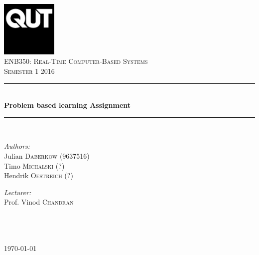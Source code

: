\begin{titlepage}

\begin{center}


\includegraphics[width=0.20\textwidth]{./media/QUT_Square_black.jpg}\\[1cm]    

\textsc{\LARGE ENB350: Real-Time Computer-Based Systems}\\[1.5cm]

\textsc{\Large Semester 1 2016}\\[0.5cm]


\newcommand{\HRule}{\rule{\linewidth}{0.5mm}}
\HRule \\[0.6cm]
{ \huge \bfseries Problem based learning Assignment}\\[0.4cm]

\HRule \\[1.5cm]

\begin{minipage}{0.4\textwidth}
\begin{flushleft} \large
\emph{Authors:}\\
Julian \textsc{Daberkow} (9637516)\\
Timo \textsc{Michalski} (?)\\
Hendrik \textsc{Oestreich} (?)
\end{flushleft}
\end{minipage}
\hfill
\begin{minipage}{0.4\textwidth}
\begin{flushright} \large
\emph{Lecturer:} \\
Prof. Vinod \textsc{Chandran}\\
\hfill\\
\hfill\\
\hfill\\
\end{flushright}
\end{minipage}

\vfill

{\large \today}

\end{center}

\end{titlepage}
